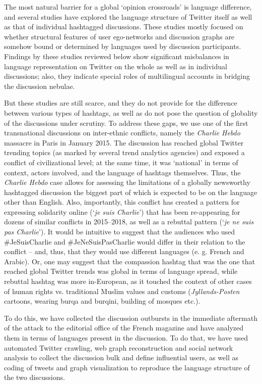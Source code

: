 The most natural barrier for a global ‘opinion crossroads’ is language difference, and several studies have explored the language structure of Twitter itself as well as that of individual hashtagged discussions. These studies mostly focused on whether structural features of user ego-networks and discussion graphs are somehow bound or determined by languages used by discussion participants. Findings by these studies reviewed below show significant misbalances in language representation on Twitter on the whole as well as in individual discussions; also, they indicate special roles of multilingual accounts in bridging the discussion nebulae.

But these studies are still scarce, and they do not provide for the difference between various types of hashtags, as well as do not pose the question of globality of the discussions under scrutiny. To address these gaps, we use one of the first transnational discussions on inter-ethnic conflicts, namely the \textit{Charlie Hebdo} massacre in Paris in January 2015. The discussion has reached global Twitter trending topics (as marked by several trend analytics agencies) and exposed a conflict of civilizational level; at the same time, it was ‘national’ in terms of context, actors involved, and the language of hashtags themselves. Thus, the \textit{Charlie Hebdo} case allows for assessing the limitations of a globally newsworthy hashtagged discussion the biggest part of which is expected to be on the language other than English. Also, importantly, this conflict has created a pattern for expressing solidarity online (‘\textit{je suis Charlie}’) that has been re-appearing for dozens of similar conflicts in 2015--2018, as well as a rebuttal pattern (‘\textit{je ne suis pas Charlie}’). It would be intuitive to suggest that the audiences who used \#JeSuisCharlie and \#JeNeSuisPasCharlie would differ in their relation to the conflict -- and, thus, that they would use different languages (e. g. French and Arabic). Or, one may suggest that the compassion hashtag that was the one that reached global Twitter trends was global in terms of language spread, while rebuttal hashtag was more in-European, as it touched the context of other cases of human rights vs. traditional Muslim values and customs (\textit{Jyllands-Posten} cartoons, wearing burqa and burqini, building of mosques etc.).

To do this, we have collected the discussion outbursts in the immediate aftermath of the attack to the editorial office of the French magazine and have analyzed them in terms of languages present in the discussion. To do that, we have used automated Twitter crawling, web graph reconstruction and social network analysis to collect the discussion bulk and define influential users, as well as coding of tweets and graph visualization to reproduce the language structure of the two discussions.

